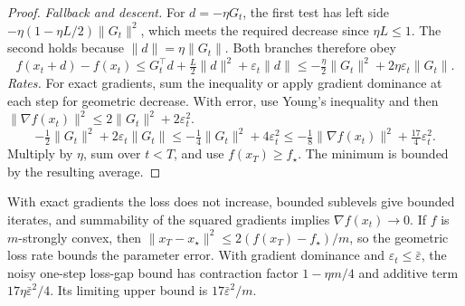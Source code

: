\documentclass[10pt,letterpaper]{article}
\begin{document}
\begin{proof}
\textit{Fallback and descent.} For \(d=-\eta G_t\), the first test has left side \(-\eta(1-\eta L/2)\|G_t\|^2\), which meets the required decrease since \(\eta L\le1\). The second holds because \(\|d\|=\eta\|G_t\|\). Both branches therefore obey
\[
f(x_t+d)-f(x_t)
\le G_t^\top d+\tfrac L2\|d\|^2+\varepsilon_t\|d\|
\le-\tfrac\eta2\|G_t\|^2+2\eta\varepsilon_t\|G_t\|.
\]
\textit{Rates.} For exact gradients, sum the inequality or apply gradient dominance at each step for geometric decrease. With error, use Young's inequality and then \(\|\nabla f(x_t)\|^2\le2\|G_t\|^2+2\varepsilon_t^2\).
\[
-\tfrac12\|G_t\|^2+2\varepsilon_t\|G_t\|
\le -\tfrac14\|G_t\|^2+4\varepsilon_t^2
\le -\tfrac18\|\nabla f(x_t)\|^2+\tfrac{17}{4}\varepsilon_t^2 .
\]
Multiply by \(\eta\), sum over \(t<T\), and use \(f(x_T)\ge f_\star\). The minimum is bounded by the resulting average.
\end{proof}

With exact gradients the loss does not increase, bounded sublevels give bounded iterates, and summability of the squared gradients implies \(\nabla f(x_t)\to0\). If \(f\) is \(m\)-strongly convex, then \(\|x_T-x_\star\|^2\le 2(f(x_T)-f_\star)/m\), so the geometric loss rate bounds the parameter error. With gradient dominance and \(\varepsilon_t\le\bar\varepsilon\), the noisy one-step loss-gap bound has contraction factor \(1-\eta m/4\) and additive term \(17\eta\bar\varepsilon^2/4\). Its limiting upper bound is \(17\bar\varepsilon^2/m\).
\end{document}
